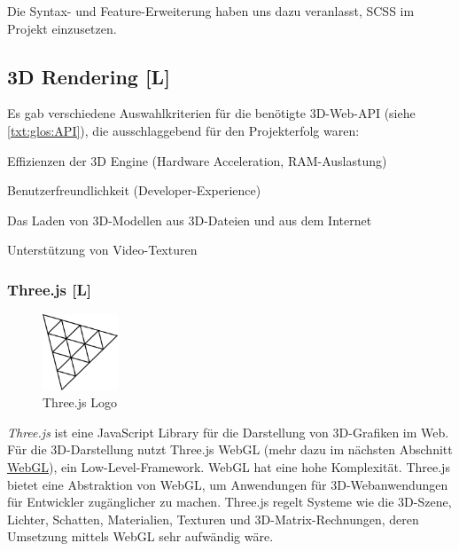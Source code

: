 Die Syntax- und Feature-Erweiterung haben uns dazu veranlasst, SCSS im Projekt einzusetzen.


\subsection{3D Rendering [L]}
Es gab verschiedene Auswahlkriterien für die benötigte 3D-Web-API (siehe \ref{txt:glos:API}), die ausschlaggebend für den Projekterfolg waren:
\begin{compactitem}
  \item Effizienzen der 3D Engine (Hardware Acceleration, RAM-Auslastung)
  \item Benutzerfreundlichkeit (Developer-Experience)
  \item Das Laden von 3D-Modellen aus 3D-Dateien und aus dem Internet
  \item Unterstützung von Video-Texturen
\end{compactitem}

\subsubsection{Three.js [L]}
\begin{figure}
    \begin{center}
      \includegraphics[width=0.2\textwidth]{pics/threeJS.png}
     \caption{Three.js Logo}
    \end{center}
\end{figure}
\emph{Three.js} ist eine JavaScript Library für die Darstellung von 3D-Grafiken im Web. Für die 3D-Darstellung nutzt Three.js WebGL (mehr dazu im nächsten Abschnitt \hyperref[ch::webgl]{WebGL}), ein Low-Level-Framework. WebGL hat eine hohe Komplexität. Three.js bietet eine Abstraktion von WebGL, um Anwendungen für 3D-Webanwendungen für Entwickler zugänglicher zu machen.
Three.js regelt Systeme wie die 3D-Szene, Lichter, Schatten, Materialien, Texturen und 3D-Matrix-Rechnungen, deren Umsetzung mittels WebGL sehr aufwändig wäre. \cite{ThreeJsFund}

